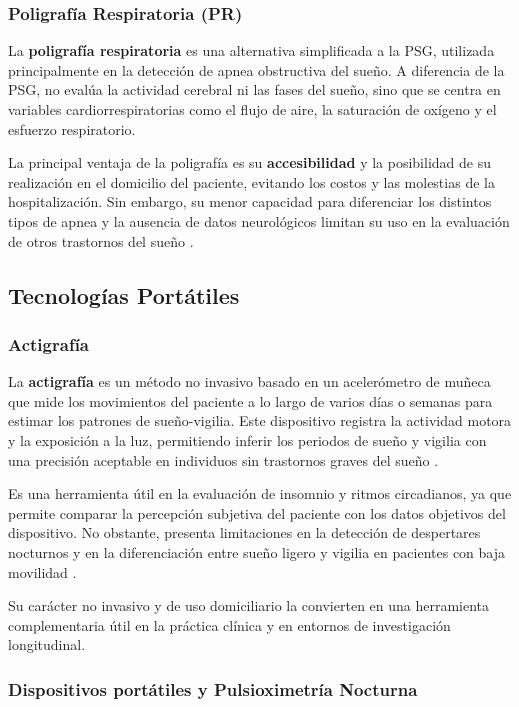 \subsubsection{Poligrafía Respiratoria (PR)}
La \textbf{poligrafía respiratoria} es una alternativa simplificada a la PSG, utilizada principalmente en la detección de apnea obstructiva del sueño. A diferencia de la PSG, no evalúa la actividad cerebral ni las fases del sueño, sino que se centra en variables cardiorrespiratorias como el flujo de aire, la saturación de oxígeno y el esfuerzo respiratorio.

La principal ventaja de la poligrafía es su \textbf{accesibilidad} y la posibilidad de su realización en el domicilio del paciente, evitando los costos y las molestias de la hospitalización. Sin embargo, su menor capacidad para diferenciar los distintos tipos de apnea y la ausencia de datos neurológicos limitan su uso en la evaluación de otros trastornos del sueño \cite{collop2007clinical}.

\subsection{Tecnologías Portátiles}

\subsubsection{Actigrafía}
La \textbf{actigrafía} es un método no invasivo basado en un acelerómetro de muñeca que mide los movimientos del paciente a lo largo de varios días o semanas para estimar los patrones de sueño-vigilia. Este dispositivo registra la actividad motora y la exposición a la luz, permitiendo inferir los periodos de sueño y vigilia con una precisión aceptable en individuos sin trastornos graves del sueño \cite{actigrafia}.

Es una herramienta útil en la evaluación de insomnio y ritmos circadianos, ya que permite comparar la percepción subjetiva del paciente con los datos objetivos del dispositivo. No obstante, presenta limitaciones en la detección de despertares nocturnos y en la diferenciación entre sueño ligero y vigilia en pacientes con baja movilidad \cite{actigrafia2013}.

Su carácter no invasivo y de uso domiciliario la convierten en una herramienta complementaria útil en la práctica clínica y en entornos de investigación longitudinal.

\subsubsection{Dispositivos portátiles y Pulsioximetría Nocturna}

